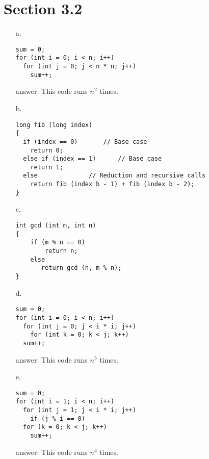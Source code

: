 \documentclass[11pt]{article}
\begin{document}
\section*{Section 3.2}
\begin{enumerate}
    
    \item[a.] 
    \begin{lstlisting}
sum = 0;
for (int i = 0; i < n; i++)
  for (int j = 0; j < n * n; j++)
    sum++;
    \end{lstlisting}
    
    \item[answer:] This code runs $n^2$ times.
    
    \item[b.]
    \begin{lstlisting}
long fib (long index)
{
  if (index == 0)		// Base case
    return 0;
  else if (index == 1)		// Base case
    return 1;
  else				// Reduction and recursive calls
    return fib (index b - 1) + fib (index b - 2);
}
    \end{lstlisting}
    
    
    \item[c.]
    \begin{lstlisting}
int gcd (int m, int n)
{
    if (m % n == 0)
        return n;
    else
       return gcd (n, m % n);
}
    \end{lstlisting}
    
    
    \item[d.]
    \begin{lstlisting}
sum = 0;
for (int i = 0; i < n; i++)
  for (int j = 0; j < i * i; j++)
    for (int k = 0; k < j; k++)
  sum++;
    \end{lstlisting}
    
    \item[answer:] This code runs $n^5$ times.
    
    
    \item[e.]
    \begin{lstlisting}
sum = 0;
for (int i = 1; i < n; i++)
  for (int j = 1; j < i * i; j++)
    if (j % i == 0)
  for (k = 0; k < j; k++)
    sum++;
    \end{lstlisting}
    
    \item[answer:] This code runs $n^4$ times.
    
\end{enumerate}
\end{document}
